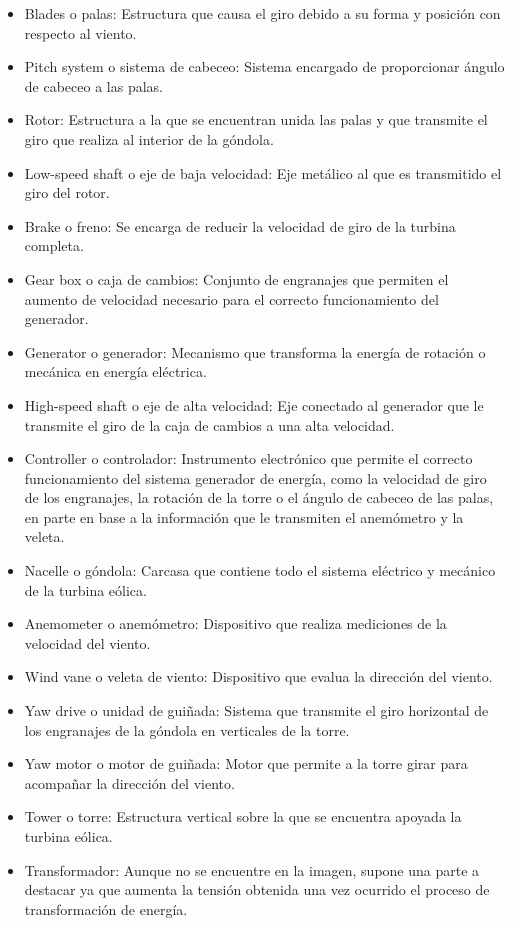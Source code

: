 \begin{itemize}
  \item Blades o palas: Estructura que causa el giro debido a su forma y posición con respecto al viento.
  \item Pitch system o sistema de cabeceo: Sistema encargado de proporcionar ángulo de cabeceo a las palas.
  \item Rotor: Estructura a la que se encuentran unida las palas y que transmite el giro que realiza al interior de la góndola.
  \item Low-speed shaft o eje de baja velocidad: Eje metálico al que es transmitido el giro del rotor.
  \item Brake o freno: Se encarga de reducir la velocidad de giro de la turbina completa.
  \item Gear box o caja de cambios: Conjunto de engranajes que permiten el aumento de velocidad necesario para el correcto funcionamiento del generador.
  \item Generator o generador: Mecanismo que transforma la energía de rotación o mecánica en energía eléctrica.
  \item High-speed shaft o eje de alta velocidad: Eje conectado al generador que le transmite el giro de la caja de cambios a una alta velocidad.
  \item Controller o controlador: Instrumento electrónico que permite el correcto funcionamiento del sistema generador de energía, como la velocidad de giro de los engranajes, la rotación de la torre o el ángulo de cabeceo de las palas, en parte en base a la información que le transmiten el anemómetro y la veleta.
  \item Nacelle o góndola: Carcasa que contiene todo el sistema eléctrico y mecánico de la turbina eólica.
  \item Anemometer o anemómetro: Dispositivo que realiza mediciones de la velocidad del viento.
  \item Wind vane o veleta de viento: Dispositivo que evalua la dirección del viento.
  \item Yaw drive o unidad de guiñada: Sistema que transmite el giro horizontal de los engranajes de la góndola en verticales de la torre.
  \item Yaw motor o motor de guiñada: Motor que permite a la torre girar para acompañar la dirección del viento.
  \item Tower o torre: Estructura vertical sobre la que se encuentra apoyada la turbina eólica.
  \item Transformador: Aunque no se encuentre en la imagen, supone una parte a destacar ya que aumenta la tensión obtenida una vez ocurrido el proceso de transformación de energía.

\end{itemize}

